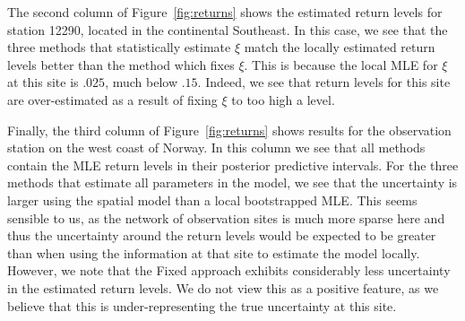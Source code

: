 \documentclass[11pt,english]{article}
\begin{document}
The second column of Figure~\ref{fig:returns} shows the estimated return levels for station 12290, located in the continental Southeast.  In this case, we see that the three methods that statistically estimate $\xi$ match the locally estimated return levels better than the method which fixes $\xi$.  This is because the local MLE for $\xi$ at this site is $.025$, much below $.15$.  Indeed, we see that return levels for this site are over-estimated as a result of fixing $\xi$ to too high a level.

Finally, the third column of Figure~\ref{fig:returns} shows results for the observation station on the west coast of Norway.  In this column we see that all methods contain the MLE return levels in their posterior predictive intervals.  For the three methods that estimate all parameters in the model, we see that the uncertainty is larger using the spatial model than a local bootstrapped MLE.  This seems sensible to us, as the network of observation sites is much more sparse here and thus the uncertainty around the return levels would be expected to be greater than when using the information at that site to estimate the model locally.  However, we note that the Fixed approach exhibits considerably less uncertainty in the estimated return levels.  We do not view this as a positive feature, as we believe that this is under-representing the true uncertainty at this site.
\end{document}
